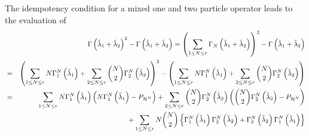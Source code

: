 \documentclass[12pt]{article}
\begin{document}
The idempotency condition for a mixed one and two particle operator leads to
the evaluation of 
\begin{eqnarray*}
&&\Gamma \left( \hat{\lambda}_{1}+\hat{\lambda}_{2}\right) ^{2}-\Gamma
\left( \hat{\lambda}_{1}+\hat{\lambda}_{2}\right) =\left( \sum_{1\leq N\leq
r}\Gamma _{N}\left( \hat{\lambda}_{1}+\hat{\lambda}_{2}\right) \right)
^{2}-\Gamma \left( \hat{\lambda}_{1}+\hat{\lambda}_{2}\right) \\
&=&\left( \sum_{1\leq N\leq r}N\Gamma _{1}^{N}\left( \hat{\lambda}%
_{1}\right) +\sum_{2\leq N\leq r}\binom{N}{2}\Gamma _{2}^{N}\left( \hat{%
\lambda}_{2}\right) \right) ^{2}-\left( \sum_{1\leq N\leq r}N\Gamma
_{1}^{N}\left( \hat{\lambda}_{1}\right) +\sum_{2\leq N\leq r}\binom{N}{2}%
\Gamma _{2}^{N}\left( \hat{\lambda}_{2}\right) \right) \\
&=&\sum_{1\leq N\leq r}N\Gamma _{1}^{N}\left( \hat{\lambda}_{1}\right)
\left( N\Gamma _{1}^{N}\left( \hat{\lambda}_{1}\right) -P_{\mathcal{H}%
^{N}}\right) +\sum_{2\leq N\leq r}\binom{N}{2}\Gamma _{2}^{N}\left( \hat{%
\lambda}_{2}\right) \left( \binom{N}{2}\Gamma _{2}^{N}\left( \hat{\lambda}%
_{2}\right) -P_{\mathcal{H}^{N}}\right) \\
&&+\sum_{1\leq N\leq r}N\binom{N}{2}\left\{ \Gamma _{1}^{N}\left( \hat{%
\lambda}_{1}\right) \Gamma _{2}^{N}\left( \hat{\lambda}_{2}\right) +\Gamma
_{2}^{N}\left( \hat{\lambda}_{2}\right) \Gamma _{1}^{N}\left( \hat{\lambda}%
_{1}\right) \right\}
\end{eqnarray*}%
\end{document}
